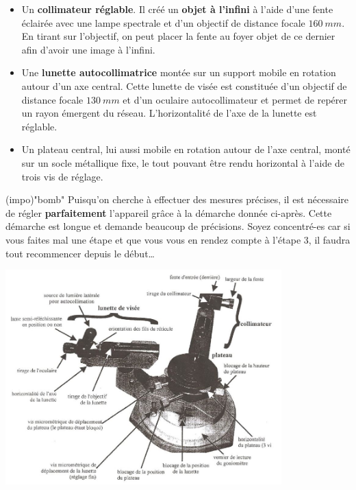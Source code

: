 \documentclass[../main/main.tex]{subfiles}
\begin{document}
{\begin{itemize}
    \item Un \textbf{collimateur réglable}. Il créé un \textbf{objet à l'infini}
      à l'aide d'une fente éclairée avec une lampe spectrale et d'un objectif de
      distance focale $\SI{160}{mm}$.
      \smallbreak
      En tirant sur l'objectif, on peut placer la fente au foyer objet de ce
      dernier afin d'avoir une image à l'infini.
    \item Une \textbf{lunette autocollimatrice} montée sur un support mobile en
      rotation autour d'un axe central. Cette lunette de visée est constituée
      d'un objectif de distance focale $\SI{130}{mm}$ et d'un oculaire
      autocollimateur et permet de repérer un rayon émergent du réseau.
      L'horizontalité de l'axe de la lunette est réglable.
    \item Un plateau central, lui aussi mobile en rotation autour de l'axe
        central, monté sur un socle métallique fixe, le tout pouvant être rendu
        horizontal à l'aide de trois vis de réglage.
\end{itemize}

\begin{tcb}(impo)"bomb"{}
  Puisqu'on cherche à effectuer des mesures précises, il est nécessaire de
  régler \textbf{parfaitement} l'appareil grâce à la démarche donnée ci-après.
  Cette démarche est longue et demande beaucoup de précisions. Soyez
  concentré-es car si vous faites mal une étape et que vous vous en rendez
  compte à l'étape 3, il faudra tout recommencer depuis le début…
\end{tcb}

\begin{center}
    \includegraphics[width=0.8\textwidth]{goniometre}
\end{center}

}
\end{document}
